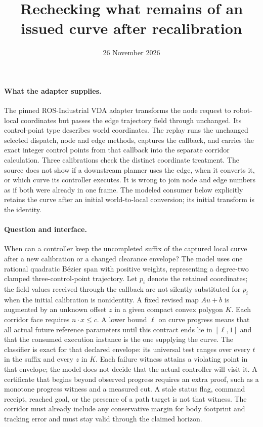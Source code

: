 \documentclass[11pt]{article}
\title{Rechecking what remains of an issued curve after recalibration}
\date{26 November 2026}
\begin{document}
\maketitle
\paragraph{What the adapter supplies.}
The pinned ROS-Industrial VDA adapter transforms the node request to
robot-local coordinates but passes the edge trajectory field through
unchanged. Its control-point type describes world coordinates. The
replay runs the unchanged selected dispatch, node and edge methods,
captures the callback, and carries the exact integer control points
from that callback into the separate corridor calculation. Three
calibrations check the distinct coordinate treatment. The source
does not show if a downstream planner uses the edge, when it converts
it, or which curve its controller executes. It is wrong to join node
and edge numbers as if both were already in one frame. The modeled
consumer below explicitly retains the curve after an initial
world-to-local conversion; its initial transform is the identity.

\paragraph{Question and interface.}
When can a controller keep the uncompleted suffix of the captured
local curve after a new calibration or a changed clearance envelope?
The model uses one rational quadratic B\'ezier span with positive
weights, representing a degree-two clamped three-control-point
trajectory. Let $p_i$ denote the retained coordinates; the field values
received through the callback are not silently substituted for $p_i$
when the initial calibration is nonidentity. A fixed revised map
$A u+b$ is augmented by an unknown offset $z$ in a given compact convex
polygon $K$. Each corridor face requires $n\mathbin\cdot x\le c$.
A lower bound $\ell$ on curve progress means that all actual future
reference parameters until this contract ends lie in $[\ell,1]$ and
that the consumed execution instance is the one supplying the curve.
The classifier is exact for that declared envelope: its universal
test ranges over every $t$ in the suffix and every $z$ in $K$.
Each failure witness attains a violating point in that envelope;
the model does not decide that the actual controller will visit it.
A certificate that begins beyond observed progress requires an extra
proof, such as a monotone progress witness and a measured cut.
A stale status flag, command receipt, reached goal, or the presence of a
path target is not that witness. The corridor must already include any
conservative margin for body footprint and tracking error and must stay
valid through the claimed horizon.
\end{document}
